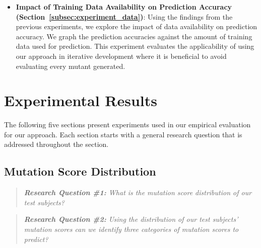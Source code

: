 \begin{itemize}
  \item \textbf{Impact of Training Data Availability on Prediction Accuracy (Section~\ref{subsec:experiment_data})}: Using the findings from the previous experiments, we explore the impact of data availability on prediction accuracy. We graph the prediction accuracies against the amount of training data used for prediction. This experiment evaluates the applicability of using our approach in iterative development where it is beneficial to avoid evaluating every mutant generated.
\end{itemize}


\section{Experimental Results}
\label{sec:experiment_results}
The following five sections present experiments used in our empirical evaluation for our approach. Each section starts with a general research question that is addressed throughout the section.


\subsection{Mutation Score Distribution}
\label{subsec:experiment_mutation_score_distribution}
\begin{quote}
	\emph{\textbf{Research Question \#1:} What is the mutation score distribution of our test subjects?}
\end{quote}

\begin{quote}
	\emph{\textbf{Research Question \#2:} Using the distribution of our test subjects' mutation scores can we identify three categories of mutation scores to predict?}
\end{quote}

